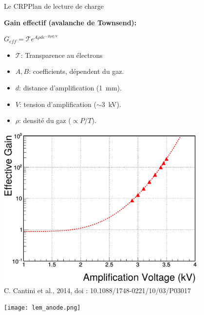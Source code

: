     \begin{frame}{Le CRP}{Plan de lecture de charge}
   		\begin{minipage}{0.43\textwidth}
   			\begin{scriptsize}
	   			\textbf{Gain effectif (avalanche de Townsend):}\\
	   		\end{scriptsize}
   			$G_{eff} = \mathcal{T}e^{A\rho d e^{-B\rho d/V}}$\\
   			\begin{scriptsize}
    			\begin{itemize}
    				\item $\mathcal{T}$: Transparence au électrons
    				\item $A,B$: coefficients, dépendent du gaz.
    				\item $d$: distance d'amplification (\SI{1}{\milli\meter}).
    				\item $V$: tension d'amplification ($\sim$\SI{3}{\kilo\volt}).
    				\item $\rho$: densité du gaz ($\propto P/T$).
    			\end{itemize}
    		\end{scriptsize} 
   			\vfill\centering\includegraphics[width=0.8\textwidth]{./pictures/gain_3L.pdf}\\\tiny{C. Cantini et al., 2014, doi : 10.1088/1748-0221/10/03/P03017}
   		\end{minipage}\hfill
   		\begin{minipage}{0.52\textwidth}
   			\texttt{[image: lem\_anode.png]}
   		\end{minipage}
    \end{frame}
    
